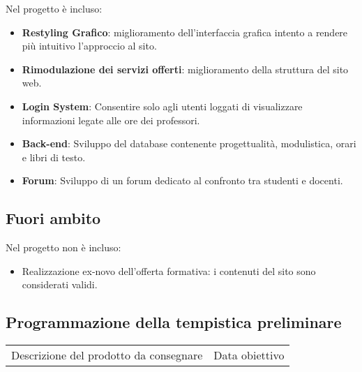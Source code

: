 \documentclass{article}
\begin{document}
\begin{flushleft}
		Nel progetto è incluso:\\

	    \begin{itemize}

			\item \textbf{Restyling Grafico}: miglioramento dell'interfaccia grafica intento a rendere più intuitivo l'approccio al sito. 

			\item \textbf{Rimodulazione dei servizi offerti}: miglioramento della struttura del sito web.

			\item \textbf{Login System}: Consentire solo agli utenti loggati di visualizzare informazioni legate alle ore dei professori.

			\item \textbf{Back-end}: Sviluppo del database contenente progettualità, modulistica, orari e libri di testo.
			
			\item \textbf{Forum}: Sviluppo di un forum dedicato al confronto tra  studenti e docenti.

		\end{itemize}

		\subsection{Fuori ambito}

		Nel progetto non è incluso:

		\begin{itemize}

			\item Realizzazione ex-novo dell'offerta formativa: i contenuti del sito sono considerati validi.

		\end{itemize}

		\vspace{2mm}

		\subsection{Programmazione della tempistica preliminare}

		\begin{tabular}{ |p{6cm}|p{4cm}|  }

			\hline

			Descrizione del prodotto da consegnare &Data obiettivo\\


\end{tabular}
\end{flushleft}
\end{document}

